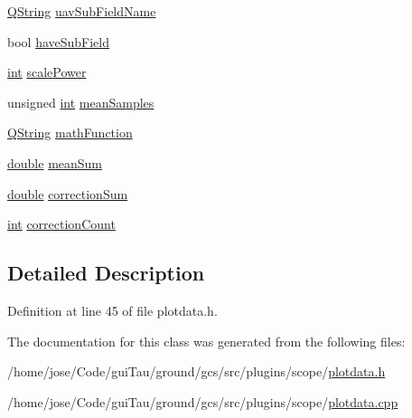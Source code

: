 \begin{DoxyCompactItemize}
\item 
\hyperlink{group___u_a_v_objects_plugin_gab9d252f49c333c94a72f97ce3105a32d}{Q\-String} \hyperlink{group___scope_plugin_ga22ac4a688fa35def44e941b82b0a0b60}{uav\-Sub\-Field\-Name}
\item 
bool \hyperlink{group___scope_plugin_ga75814d7f770a1a8348f39dc7ca4bdb8f}{have\-Sub\-Field}
\item 
\hyperlink{ioapi_8h_a787fa3cf048117ba7123753c1e74fcd6}{int} \hyperlink{group___scope_plugin_gad4b115ab449c4276ef15d3e2862e6280}{scale\-Power}
\item 
unsigned \hyperlink{ioapi_8h_a787fa3cf048117ba7123753c1e74fcd6}{int} \hyperlink{group___scope_plugin_ga577111acdda17558321da13bff25a7c0}{mean\-Samples}
\item 
\hyperlink{group___u_a_v_objects_plugin_gab9d252f49c333c94a72f97ce3105a32d}{Q\-String} \hyperlink{group___scope_plugin_gaa8ea6880a7faa36947144d2df62d6642}{math\-Function}
\item 
\hyperlink{_super_l_u_support_8h_a8956b2b9f49bf918deed98379d159ca7}{double} \hyperlink{group___scope_plugin_ga619dc668a50f1123f71de7baa4dc5f9c}{mean\-Sum}
\item 
\hyperlink{_super_l_u_support_8h_a8956b2b9f49bf918deed98379d159ca7}{double} \hyperlink{group___scope_plugin_ga802021e218f3dadce03011cdeea7d90b}{correction\-Sum}
\item 
\hyperlink{ioapi_8h_a787fa3cf048117ba7123753c1e74fcd6}{int} \hyperlink{group___scope_plugin_ga85cd1767be2be06460ecbbd11b9ec366}{correction\-Count}
\end{DoxyCompactItemize}


\subsection{Detailed Description}


Definition at line 45 of file plotdata.\-h.



The documentation for this class was generated from the following files\-:\begin{DoxyCompactItemize}
\item 
/home/jose/\-Code/gui\-Tau/ground/gcs/src/plugins/scope/\hyperlink{plotdata_8h}{plotdata.\-h}\item 
/home/jose/\-Code/gui\-Tau/ground/gcs/src/plugins/scope/\hyperlink{plotdata_8cpp}{plotdata.\-cpp}\end{DoxyCompactItemize}
